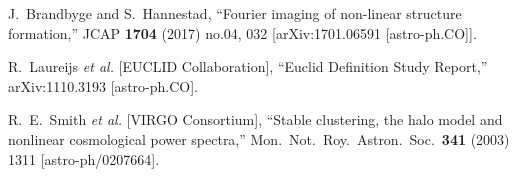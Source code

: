 \documentclass[11pt,a4paper]{article}
\renewcommand\({\left(}
\renewcommand\){\right)}
\renewcommand\[{\left[}
\renewcommand\]{\right]}
\begin{document}
\begin{thebibliography}{10}
  J.~Brandbyge and S.~Hannestad,
  ``Fourier imaging of non-linear structure formation,''
  JCAP {\bf 1704} (2017) no.04,  032
  [arXiv:1701.06591 [astro-ph.CO]].

  R.~Laureijs {\it et al.} [EUCLID Collaboration],
  ``Euclid Definition Study Report,''
  arXiv:1110.3193 [astro-ph.CO].

  R.~E.~Smith {\it et al.} [VIRGO Consortium],
  ``Stable clustering, the halo model and nonlinear cosmological power spectra,''
  Mon.\ Not.\ Roy.\ Astron.\ Soc.\  {\bf 341} (2003) 1311
  [astro-ph/0207664].
	

	
	
\end{thebibliography}\endgroup
\end{document}
